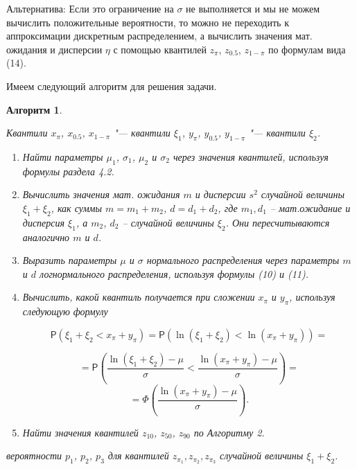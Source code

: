 \documentclass[12pt]{article}
\newtheorem{alg}{Алгоритм}
\newenvironment{pr1}{\par\noindent{\bf Дано:}}{}
\newenvironment{pr3}{\par\noindent{\bf Результат:}}{}
\begin{document}
	Альтернатива:
	Если это ограничение на $\sigma$ не выполняется и мы не можем вычислить положительные вероятности, то можно не переходить к аппроксимации дискретным распределением, а вычислить значения мат. ожидания и дисперсии $\eta$ с помощью квантилей $z_{\pi}$, $z_{0.5}$, $z_{1-\pi}$ по формулам вида (14).
	
	Имеем следующий алгоритм для решения задачи.

	\begin{alg}\label{al3}
		\begin{pr1}
			Квантили $x_{\pi}$, $x_{0.5}$, $x_{1-\pi}$ "--- квантили $\xi_{1}$, $y_{\pi}$, $y_{0.5}$, $y_{1-\pi}$ "--- квантили $\xi_{2}$.
		\end{pr1}
		\begin{enumerate}
			\item Найти параметры $\mu_{1}$, $\sigma_{1}$, $\mu_{2}$ и $\sigma_{2}$ через значения квантилей, используя формулы раздела 4.2.
			\item Вычислить значения мат. ожидания $m$ и дисперсии $s^{2}$ случайной величины $\xi_{1} + \xi_{2}$, как суммы $m = m_{1}+m_{2}$, $d=d_{1} + d_{2}$, где $m_{1}, d_{1}$ -- мат.ожидание и дисперсия $\xi_{1}$, а $m_{2}$, $d_{2}$ -- случайной величины $\xi_{2}$. Они пересчитываются аналогично $m$ и $d$.
			\item Выразить параметры $\mu$ и $\sigma$ нормального распределения через параметры $m$ и $d$ логнормального распределения, используя формулы (10) и (11).
			\item Вычислить, какой квантиль получается при сложении $x_{\pi}$ и $y_{\pi}$, используя следующую формулу
			
			\begin{equation*}
				\mathsf{P}(\xi_{1}+\xi_{2}< x_{\pi}+y_{\pi}) = \mathsf{P}(\ln(\xi_{1}+\xi_{2})<\ln(x_{\pi}+y_{\pi}))=
			\end{equation*}
			
			
			\[=\mathsf{P}\left(\displaystyle{\frac{\ln(\xi_{1}+\xi_{2})-\mu}{\sigma}}<\displaystyle{\frac{\ln(x_{\pi}+y_{\pi})-\mu}{\sigma}}\right)=\]\[ =\Phi\left(\dfrac{\ln(x_{\pi}+y_{\pi})-\mu}{\sigma}\right).\]
			
			
			\item Найти значения квантилей $z_{10}$, $z_{50}$, $z_{90}$ по Алгоритму 2.
		\end{enumerate}
	
		\begin{pr3}\end{pr3} вероятности $p_{1}$, $p_{2}$, $p_{3}$ для квантилей $z_{\pi_{1}}, z_{\pi_{2}}, z_{\pi_{3}}$ случайной величины $\xi_{1} + \xi_{2}$.
		
	\end{alg}
\end{document}
